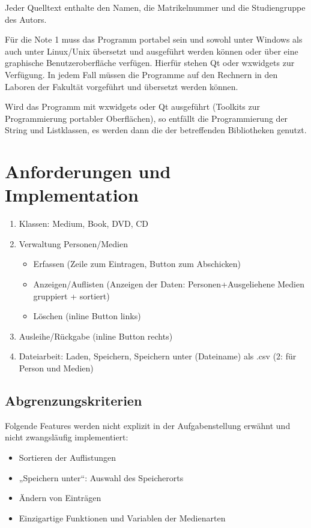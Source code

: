 Jeder Quelltext enthalte den Namen, die Matrikelnummer und die Studiengruppe des Autors.

Für die Note 1 muss das Programm portabel sein und sowohl unter Windows als auch unter Linux/Unix übersetzt und ausgeführt werden können oder über eine graphische Benutzeroberfläche verfügen. Hierfür stehen Qt oder wxwidgets zur Verfügung. In jedem Fall müssen die Programme auf den Rechnern in den Laboren der Fakultät vorgeführt und übersetzt werden können.

Wird das Programm mit wxwidgets oder Qt ausgeführt (Toolkits zur Programmierung portabler Oberflächen), so entfällt die Programmierung der String und Listklassen, es werden dann die der betreffenden Bibliotheken genutzt.

\section*{Anforderungen und Implementation}
\begin{enumerate}
\item Klassen: Medium, Book, DVD, CD
\item Verwaltung Personen/Medien
\begin{itemize}
\item Erfassen (Zeile zum Eintragen, Button zum Abschicken)
\item Anzeigen/Auflisten (Anzeigen der Daten: Personen+Ausgeliehene Medien gruppiert + sortiert)
\item Löschen (inline Button links)
\end{itemize}
\item Ausleihe/Rückgabe (inline Button rechts)
\item Dateiarbeit: Laden, Speichern, Speichern unter (Dateiname) als .csv (2: für Person und Medien)
\end{enumerate}

\subsection*{Abgrenzungskriterien}
Folgende Features werden nicht explizit in der Aufgabenstellung erwähnt und nicht zwangsläufig implementiert:
\begin{itemize}
\item Sortieren der Auflistungen
\item „Speichern unter“: Auswahl des Speicherorts
\item Ändern von Einträgen
\item Einzigartige Funktionen und Variablen der Medienarten
\end{itemize}

